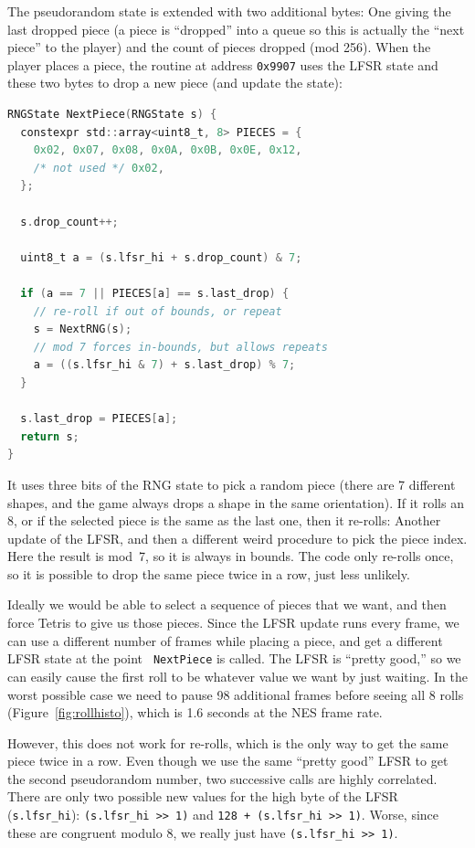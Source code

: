 \documentclass[twocolumn]{article}
\begin{document}
The pseudorandom state is extended with two additional bytes: One
giving the last dropped piece (a piece is ``dropped'' into a queue so
this is actually the ``next piece'' to the player) and the count of
pieces dropped (mod 256). When the player places a piece, the routine
at address {\tt 0x9907} uses the LFSR state and these two bytes to
drop a new piece (and update the state):

\begin{lstlisting}[language=C]
RNGState NextPiece(RNGState s) {
  constexpr std::array<uint8_t, 8> PIECES = {
    0x02, 0x07, 0x08, 0x0A, 0x0B, 0x0E, 0x12,
    /* not used */ 0x02,
  };

  s.drop_count++;

  uint8_t a = (s.lfsr_hi + s.drop_count) & 7;

  if (a == 7 || PIECES[a] == s.last_drop) {
    // re-roll if out of bounds, or repeat
    s = NextRNG(s);
    // mod 7 forces in-bounds, but allows repeats
    a = ((s.lfsr_hi & 7) + s.last_drop) % 7;
  }
  
  s.last_drop = PIECES[a];
  return s;
}
\end{lstlisting}

It uses three bits of the RNG state to pick a random piece (there are
7 different shapes, and the game always drops a shape in the same
orientation). If it rolls an 8, or if the selected piece is the same
as the last one, then it re-rolls: Another update of the LFSR, and
then a different weird procedure to pick the piece index. Here the
result is {\sf mod}~7, so it is always in bounds. The code only
re-rolls once, so it is possible to drop the same piece twice in
a row, just less unlikely.

Ideally we would be able to select a sequence of pieces that we want,
and then force Tetris to give us those pieces. Since the LFSR update
runs every frame, we can use a different number of frames while
placing a piece, and get a different LFSR state at the point {\tt
  NextPiece} is called. The LFSR is ``pretty good,'' so we can easily
cause the first roll to be whatever value we want by just waiting. In
the worst possible case we need to pause 98 additional frames before
seeing all 8 rolls (Figure~\ref{fig:rollhisto}), which is 1.6 seconds
at the NES frame rate.

However, this does not work for re-rolls, which is the only way to get
the same piece twice in a row. Even though we use the same ``pretty
good'' LFSR to get the second pseudorandom number, two successive
calls are highly correlated. There are only two possible new values
for the high byte of the LFSR (\verb|s.lfsr_hi|):
\verb|(s.lfsr_hi >> 1)| and \verb|128 + (s.lfsr_hi >> 1)|. Worse,
since these are congruent modulo $8$, we really just have
\verb|(s.lfsr_hi >> 1)|.
 
\end{document}
